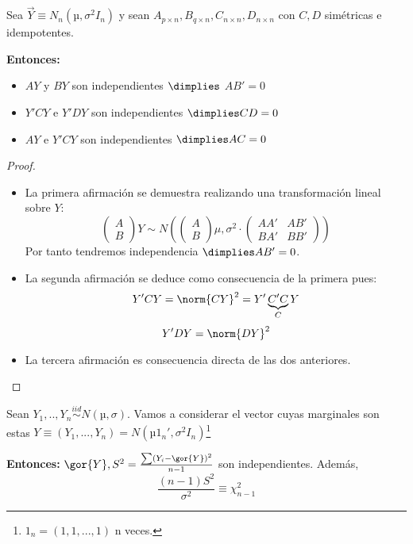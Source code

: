 \begin{prop}
\label{prop:tema1_pepino}
Sea $\vec{Y}\equiv N_n (µ,σ^2I_n)$ y sean $A_{p\times n},B_{q\times n},C_{n\times n},D_{n\times n}$ con $C,D$ simétricas e idempotentes.

\textbf{Entonces:}
\begin{itemize}
	\item $AY$ y $BY$ son independientes $\dimplies$ $AB' = 0$
	\item $Y'CY$ e $Y'DY$ son independientes $\dimplies CD = 0$
	\item $AY$ e $Y'CY$ son independientes $\dimplies AC=0$
\end{itemize}

\begin{proof}
	\begin{itemize}
		\item La primera afirmación se demuestra realizando una transformación lineal sobre $Y$:
		\[\left( \begin{array}{c} A\\B \end{array} \right)Y \sim
			N\left(
				\left( \begin{array}{c} A\\B \end{array} \right)μ,
				σ^2·\left(\begin{array}{c|c}
					AA' & AB'\\ \hline
					BA' & BB'
				\end{array}\right)
			\right)
		\]
		Por tanto tendremos independencia $\dimplies AB' = 0$.

		\item La segunda afirmación se deduce como consecuencia de la primera pues:
		\[Y'CY = \norm{CY}^2 = Y'\underbrace{C'C}_{C}Y\]
		\[Y'DY = \norm{DY}^2\]
		\item La tercera afirmación es consecuencia directa de las dos anteriores.
	\end{itemize}
\end{proof}

\end{prop}

\begin{lemma}
\label{lemma:fisher}
Sean $Y_1,..,Y_n \overset{iid}{\sim} N(µ,σ)$. Vamos a considerar el vector cuyas marginales son estas $Y \equiv (Y_1,...,Y_n) = N(µ1_n',σ^2I_n)$\footnote{$1_n = (1,1,...,1)$ n veces.}

\textbf{Entonces: } $\gor{Y}, S^2 = \frac{\sum (Y_i - \gor{Y})^2}{n-1}$ son independientes. Además,
\[\frac{(n-1)S^2}{σ^2} \equiv \chi^2_{n-1}\]

\end{lemma}

